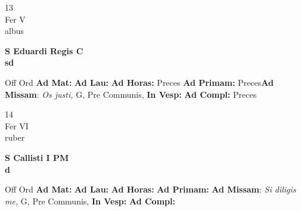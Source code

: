 \documentclass[10pt, openany]{book}
\begin{document}
    \begin{center}
        \begin{minipage}{3.5in}
            \vspace{2em}
            \begin{minipage}{0.5in}
                {\Huge 13} \\
                {\normalsize Fer V} \\
                {\normalsize albus}
            \end{minipage}
            \begin{minipage}{3.0in}
                \textbf{ \large S Eduardi Regis C \\
                \textnormal{\normalsize sd}} \\ 
            \end{minipage}
            \begin{justify}Off Ord
                \textbf{Ad Mat: }
                \textbf{Ad Lau: }
                \textbf{Ad Horas: }Preces
                \textbf{Ad Primam: }Preces\textbf{Ad Missam}: \textit{Os justi,} G, Pre Communis,  
                \textbf{In Vesp: }
                \textbf{Ad Compl: }Preces
            \end{justify}
        \end{minipage}
    \end{center}

    \begin{center}
        \begin{minipage}{3.5in}
            \vspace{2em}
            \begin{minipage}{0.5in}
                {\Huge 14} \\
                {\normalsize Fer VI} \\
                {\normalsize ruber}
            \end{minipage}
            \begin{minipage}{3.0in}
                \textbf{ \large S Callisti I PM \\
                \textnormal{\normalsize d}} \\ 
            \end{minipage}
            \begin{justify}Off Ord
                \textbf{Ad Mat: }
                \textbf{Ad Lau: }
                \textbf{Ad Horas: }
                \textbf{Ad Primam: }\textbf{Ad Missam}: \textit{Si diligis me,} G, Pre Communis,  
                \textbf{In Vesp: }
                \textbf{Ad Compl: }
            \end{justify}
        \end{minipage}
    \end{center}
\end{document}
